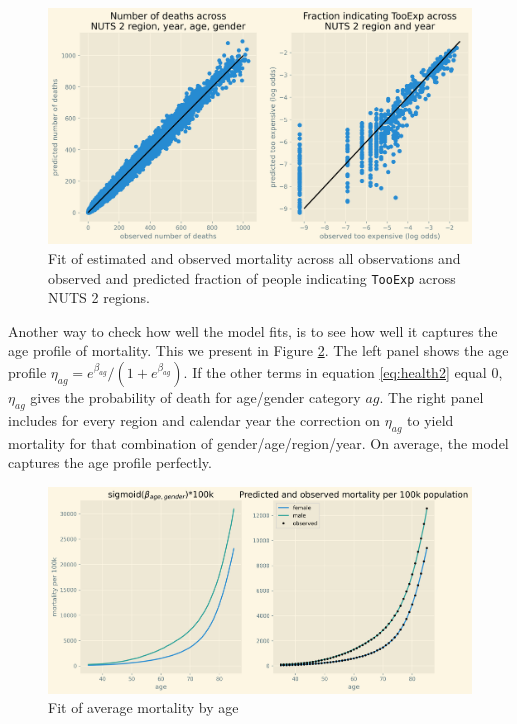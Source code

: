 \documentclass[a4paper,12pt]{article}
\begin{document}
\begin{figure}[htbp]
\centering
\includegraphics[width=.9\linewidth]{./figures/fit_baseline_model.png}
\caption{\label{fig:ModelFit}Fit of estimated and observed mortality across all observations and observed and predicted fraction of people indicating \texttt{TooExp} across NUTS 2 regions.}
\end{figure}

Another way to check how well the model fits, is to see how well it captures the age profile of mortality. This we present in Figure \ref{fig:Fit_mortality_by_age}. The left panel shows the age profile \(\eta_{ag} = e^{\beta_{ag}}/(1+e^{\beta_{ag}})\). If the other terms in equation \eqref{eq:health2} equal 0, \(\eta_{ag}\) gives the probability of death for age/gender category \(ag\). The right panel includes for every region and calendar year the correction on \(\eta_{ag}\) to yield mortality for that combination of gender/age/region/year. On average, the model captures the age profile perfectly.


\begin{figure}[htbp]
\centering
\includegraphics[width=.9\linewidth]{./figures/age_profile_baseline.png}
\caption{\label{fig:Fit_mortality_by_age}Fit of average mortality by age}
\end{figure}
\end{document}
